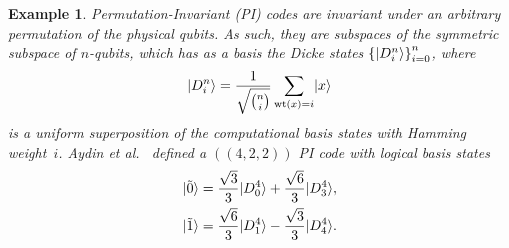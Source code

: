 \documentclass[]{amsart}
\DeclarePairedDelimiter\ket{\lvert}{\rangle}
\DeclareMathOperator{\wt}{wt}
\newtheorem{example}[theorem]{Example}
\begin{document}
\begin{example}\label{ex:eapi4}
    Permutation-Invariant (PI) codes are invariant under an arbitrary permutation of the physical qubits. As such, they are subspaces of the symmetric subspace of $n$-qubits, which has as a basis the Dicke states $\left\{\ket{D_i^n}\right\}_{i=0}^n$, where
    \begin{equation*}
        \ket{D_i^n}=\frac{1}{\sqrt{\binom{n}{i}}}\sum\limits_{\wt\left(x\right)=i}\ket{x}
    \end{equation*}
    is a uniform superposition of the computational basis states with Hamming weight~$i$. Aydin et al.~\cite{AAB2024} defined a $\left(\!\left(4,2,2\right)\!\right)$ PI code with logical basis states
    \begin{align*}
        \ket{\tilde{0}} & = \frac{\sqrt{3}}{3}\ket{D_0^4}+\frac{\sqrt{6}}{3}\ket{D_3^4}, \\
        \ket{\tilde{1}} & = \frac{\sqrt{6}}{3}\ket{D_1^4}-\frac{\sqrt{3}}{3}\ket{D_4^4}.
    \end{align*}


\end{example}
\end{document}
